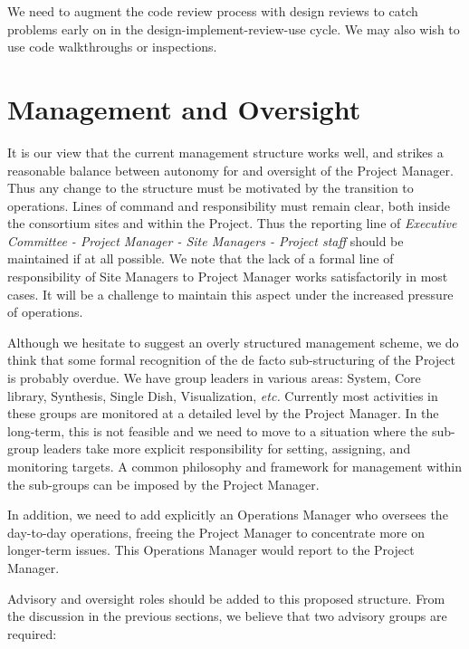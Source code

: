 We need to augment the code review process with design reviews to catch
problems early on in the design-implement-review-use cycle. We may also
wish to use code walkthroughs or inspections.

\section{Management and Oversight}

It is our view that the current management structure works well, and
strikes a reasonable balance between autonomy for and oversight of the
Project Manager. Thus any change to the structure must be motivated by
the transition to operations. Lines of command and responsibility
must remain clear, both inside the consortium sites and within the
Project. Thus the reporting line of {\em Executive Committee - Project
Manager - Site Managers - Project staff} should be maintained if at
all possible. We note that the lack of a formal line of responsibility
of Site Managers to Project Manager works satisfactorily in most cases.
It will be a challenge to maintain this aspect under the increased
pressure of operations.

Although we hesitate to suggest an overly structured management
scheme, we do think that some formal recognition of the de facto
sub-structuring of the Project is probably overdue. We have group
leaders in various areas: System, Core library, Synthesis, Single
Dish, Visualization, {\em etc.} Currently most activities in these
groups are monitored at a detailed level by the Project Manager. In
the long-term, this is not feasible and we need to move to a situation
where the sub-group leaders take more explicit responsibility for
setting, assigning, and monitoring targets. A common philosophy and
framework for management within the sub-groups can be imposed by the
Project Manager.

In addition, we need to add explicitly an Operations Manager who
oversees the day-to-day operations, freeing the Project Manager to
concentrate more on longer-term issues. This Operations Manager would
report to the Project Manager.

Advisory and oversight roles should be added to this proposed
structure. From the discussion in the previous sections, we believe
that two advisory groups are required:


